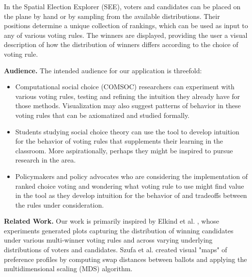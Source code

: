 In the Spatial Election Explorer (SEE),
voters and candidates can be placed on the plane by hand
or by sampling from the available distributions.
Their positions determine a unique collection of rankings,
which can be used as input to any of various voting rules.
The winners are displayed, providing the user a visual description
of how the distribution of winners differs according to the choice of voting rule.

\textbf{Audience.}
The intended audience for our application is threefold:
\begin{itemize}[nosep]  %
\item[1.] Computational social choice (COMSOC) researchers can experiment with various voting rules,
testing and refining the intuition they already have for those methods.
Visualization may also suggest patterns of behavior in these voting rules that can
be axiomatized and studied formally.
\item[2.] Students studying social choice theory can use the tool to develop intuition
for the behavior of voting rules that supplements their learning in the
classroom. More aspirationally, perhaps they might be inspired to pursue
research in the area.
\item[3.] Policymakers and policy advocates who are considering the implementation of
ranked choice voting and wondering what voting rule to use might find value in
the tool as they develop intuition for the behavior of and tradeoffs between
the rules under consideration.
\end{itemize}

\textbf{Related Work.}
Our work is primarily inspired by Elkind et al. \cite{elkind},
whose experiments generated plots capturing the distribution of winning candidates
under various multi-winner voting rules
and across varying underlying distributions of voters and candidates.
%
Szufa et al. \cite{dap} created visual "maps" of preference profiles
by computing swap distances between ballots and applying the
multidimensional scaling (MDS) algorithm.

